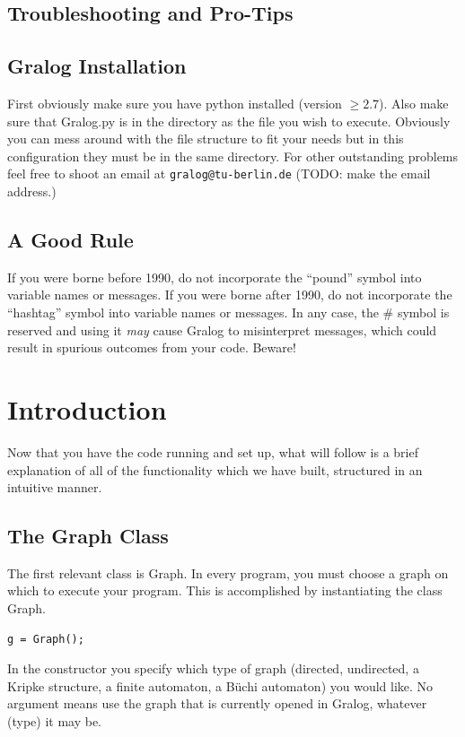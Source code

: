 \subsection{Troubleshooting and Pro-Tips}
\subsection{Gralog Installation}
First obviously make sure you have python installed (version $\ge
2.7$). Also make sure that Gralog.py is in the directory as the file you
wish to execute. Obviously you can mess around with the file structure
to fit your needs but in this configuration they must be in the same
directory. For other outstanding problems feel free to shoot an email
at \texttt{gralog@tu-berlin.de} (TODO: make the email address.)

\subsection{A Good Rule}
If you were borne before 1990, do not incorporate the "`pound"' symbol into variable names or messages. If you were borne after 1990, do not incorporate the "`hashtag"' symbol into variable names or messages. In any case, the \# symbol is reserved and using it \textit{may} cause Gralog to misinterpret messages, which could result in spurious outcomes from your code. Beware!

\section{Introduction}
Now that you have the code running and set up, what will follow is a brief explanation of all of the functionality which we have built, structured in an intuitive manner.

\subsection{The Graph Class}
The first relevant class is Graph. In every program, you must choose a graph on which to execute your program. This is accomplished by instantiating the class Graph. 

\begin{lstlisting}
g = Graph();
\end{lstlisting}

In the constructor you specify which type of graph (directed,
undirected, a Kripke structure, a finite automaton, a Büchi automaton) you would like. No
argument means use the graph that is currently opened in Gralog, whatever (type) it may be.

